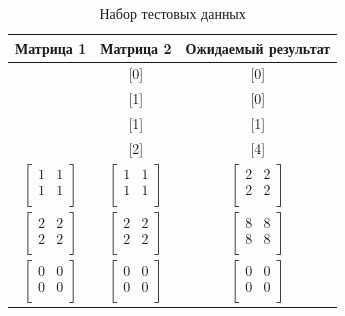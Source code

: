 \documentclass[a4paper,14pt]{report}
\begin{document}
\begin{table}[h]
	\caption{Набор тестовых данных}
		\begin{tabular}{|c | c | c |}
	 	\hline
		Матрица 1 & Матрица 2 & Ожидаемый результат \\ [0.5ex]
	 	\hline\hline
		[0] & [0] & [0] \\
		\hline
		[0] & [1] & [0] \\
		\hline
		[1] & [1] & [1] \\
		\hline
		[2] & [2] & [4] \\
		\hline
		$\begin{bmatrix}
		1 & 1 \\
		1 & 1 \\
		\end{bmatrix}$ &
		$\begin{bmatrix}
		1 & 1 \\
		1 & 1 \\
		\end{bmatrix}$ &
		$\begin{bmatrix}
		2 & 2 \\
		2 & 2 \\
		\end{bmatrix}$ \\
		\hline
		$\begin{bmatrix}
		2 & 2 \\
		2 & 2 \\
		\end{bmatrix}$ &
		$\begin{bmatrix}
		2 & 2 \\
		2 & 2 \\
		\end{bmatrix}$ &
		$\begin{bmatrix}
		8 & 8 \\
		8 & 8 \\
		\end{bmatrix}$ \\
		\hline

		$\begin{bmatrix}
		0 & 0 \\
		0 & 0 \\
		\end{bmatrix}$ &
		$\begin{bmatrix}
		0 & 0 \\
		0 & 0 \\
		\end{bmatrix}$ &
		$\begin{bmatrix}
		0 & 0 \\
		0 & 0 \\
		\end{bmatrix}$ \\
		\hline


\end{tabular}
\end{table}
\end{document}
